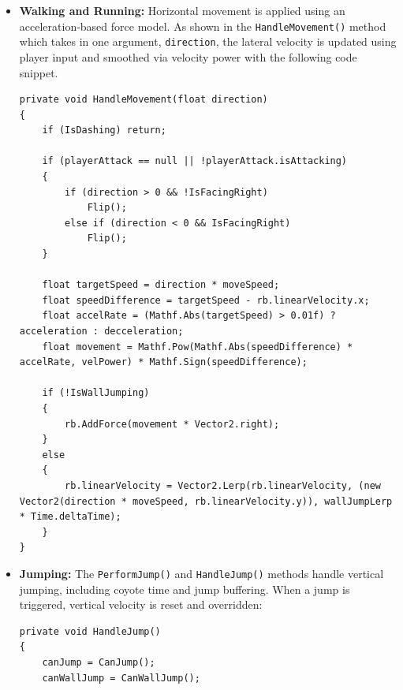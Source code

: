 \documentclass[12pt,oneside,openright,a4paper]{cpe-english-project}
\begin{document}
\begin{itemize}
\item  \textbf{Walking and Running:} Horizontal movement is applied using an acceleration-based force model. As shown in the \texttt{HandleMovement()} method which takes in one argument, \texttt{direction}, the lateral velocity is updated using player input and smoothed via velocity power with the following code snippet.
\begin{lstlisting}[language={[Sharp]C}]
private void HandleMovement(float direction)
{
	if (IsDashing) return;

	if (playerAttack == null || !playerAttack.isAttacking)
	{
		if (direction > 0 && !IsFacingRight)
			Flip();
		else if (direction < 0 && IsFacingRight)
			Flip();
	}

	float targetSpeed = direction * moveSpeed;
	float speedDifference = targetSpeed - rb.linearVelocity.x;
	float accelRate = (Mathf.Abs(targetSpeed) > 0.01f) ? acceleration : decceleration;
	float movement = Mathf.Pow(Mathf.Abs(speedDifference) * accelRate, velPower) * Mathf.Sign(speedDifference);

	if (!IsWallJumping)
	{
		rb.AddForce(movement * Vector2.right);
	}
	else
	{
		rb.linearVelocity = Vector2.Lerp(rb.linearVelocity, (new Vector2(direction * moveSpeed, rb.linearVelocity.y)), wallJumpLerp * Time.deltaTime);
	}
}
\end{lstlisting}
\item  \textbf{Jumping:} The \texttt{PerformJump()} and \texttt{HandleJump()} methods handle vertical jumping, including coyote time and jump buffering. When a jump is triggered, vertical velocity is reset and overridden:
\begin{lstlisting}[language={[Sharp]C}]
private void HandleJump()
{
	canJump = CanJump();
	canWallJump = CanWallJump();


\end{lstlisting}
\end{itemize}
\end{document}

